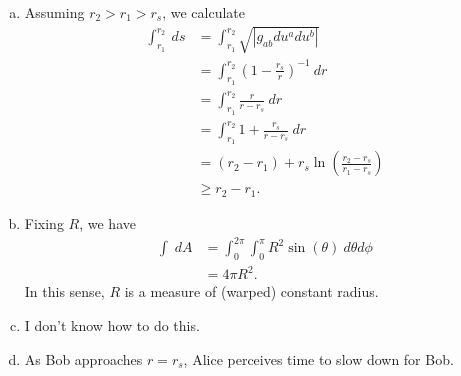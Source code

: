 \documentclass[10pt]{mypackage}
\begin{document}
\begin{solution}[30.22]\hfill
  \begin{enumerate}[(a)]
    \item Assuming $r_2 > r_1 > r_s$, we calculate
      \begin{align*}
        \int_{r_1}^{r_2} \:ds &= \int_{r_1}^{r_2}\sqrt{\left\vert g_{ab}du^{a}du^{b} \right\vert}\\
                              &= \int_{r_1}^{r_2} \left( 1-\frac{r_s}{r} \right)^{-1}\:dr\\
                              &= \int_{r_1}^{r_2} \frac{r}{r-r_s}\:dr\\
                              &= \int_{r_1}^{r_2} 1 + \frac{r_s}{r-r_s}\:dr\\
                              &= \left( r_2-r_1 \right) + r_s\ln\left( \frac{r_2-r_s}{r_1-r_s} \right)\\
                              &\geq r_2-r_1.
      \end{align*}
    \item Fixing $R$, we have
      \begin{align*}
        \int_{}^{} \:dA &= \int_{0}^{2\pi}\int_{0}^{\pi}R^2\sin\left( \theta \right)\:d\theta d\phi\\
                        &= 4\pi R^2.
      \end{align*}
      In this sense, $R$ is a measure of (warped) constant radius.
    \item I don't know how to do this.
    \item As Bob approaches $r = r_s$, Alice perceives time to slow down for Bob.
  \end{enumerate}
\end{solution}
\end{document}
